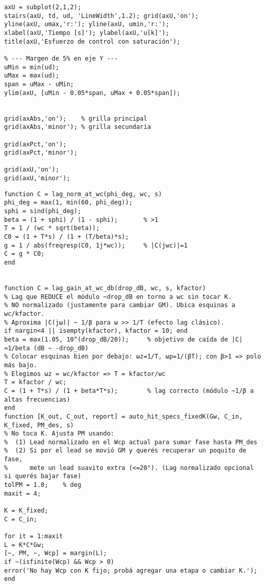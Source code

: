 \begin{lstlisting}[style=matlabstyle,caption={Hoja cálculos utilizada para el diseño de los compensadores.},label={matlab:hojaDeCalculos}]
% ---------- Subplot 2: esfuerzo de control ----------
axU = subplot(2,1,2);
stairs(axU, td, ud, 'LineWidth',1.2); grid(axU,'on');
yline(axU, umax,'r:'); yline(axU, umin,'r:');
xlabel(axU,'Tiempo [s]'); ylabel(axU,'u[k]');
title(axU,'Esfuerzo de control con saturación');

% --- Margen de 5% en eje Y ---
uMin = min(ud);
uMax = max(ud);
span = uMax - uMin;
ylim(axU, [uMin - 0.05*span, uMax + 0.05*span]);


grid(axAbs,'on');    % grilla principal
grid(axAbs,'minor'); % grilla secundaria

grid(axPct,'on');
grid(axPct,'minor');

grid(axU,'on');
grid(axU,'minor');
\end{lstlisting}

\begin{lstlisting}[style=matlabstyle,caption={Funciones creadas para este laboratorio.},label={matlab:newfunc}]
function C = lag_norm_at_wc(phi_deg, wc, s)
phi_deg = max(1, min(60, phi_deg));
sphi = sind(phi_deg);
beta = (1 + sphi) / (1 - sphi);       % >1
T = 1 / (wc * sqrt(beta));
C0 = (1 + T*s) / (1 + (T/beta)*s);
g = 1 / abs(freqresp(C0, 1j*wc));     % |C(jwc)|=1
C = g * C0;
end


function C = lag_gain_at_wc_db(drop_dB, wc, s, kfactor)
% Lag que REDUCE el módulo ~drop_dB en torno a wc sin tocar K.
% NO normalizado (justamente para cambiar GM). Ubica esquinas a wc/kfactor.
% Aproxima |C(jω)| ~ 1/β para ω >> 1/T (efecto lag clásico).
if nargin<4 || isempty(kfactor), kfactor = 10; end
beta = max(1.05, 10^(drop_dB/20));     % objetivo de caída de |C|≈1/beta (dB ~ -drop_dB)
% Colocar esquinas bien por debajo: ωz=1/T, ωp=1/(βT); con β>1 => polo más bajo.
% Elegimos ωz = wc/kfactor => T = kfactor/wc
T = kfactor / wc;
C = (1 + T*s) / (1 + beta*T*s);        % lag correcto (módulo ~1/β a altas frecuencias)
end
function [K_out, C_out, report] = auto_hit_specs_fixedK(Gw, C_in, K_fixed, PM_des, s)
% No toca K. Ajusta PM usando:
%  (1) Lead normalizado en el Wcp actual para sumar fase hasta PM_des
%  (2) Si por el lead se movió GM y querés recuperar un poquito de fase,
%      mete un lead suavito extra (<=20°). (Lag normalizado opcional si querés bajar fase)
tolPM = 1.0;    % deg
maxit = 4;

K = K_fixed;
C = C_in;

for it = 1:maxit
L = K*C*Gw;
[~, PM, ~, Wcp] = margin(L);
if ~(isfinite(Wcp) && Wcp > 0)
error('No hay Wcp con K fijo; probá agregar una etapa o cambiar K.');
end


\end{lstlisting}
